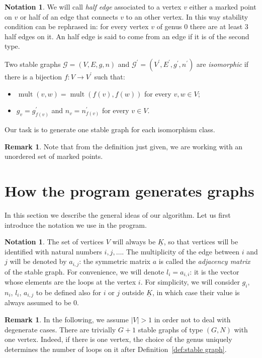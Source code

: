 \documentclass{amsart}
\theoremstyle{plain}
\theoremstyle{definition}
\newtheorem{remark}[theorem]{Remark}
\newtheorem{notation}[theorem]{Notation}
\DeclareMathOperator{\mult}{mult}
\newcommand{\graph}{\mathcal{G}}
\newcommand{\abs}[1]{\left|#1\right|}
\newcommand{\ubar}[1]{\underline{#1}}
\begin{document}
\begin{notation} We will call \emph{half edge} associated to a vertex $v$
either a marked point on $v$ or half of an edge that connects $v$ to an
other vertex. In this way stability condition can be rephrased in: for
every vertex $v$ of genus $0$ there are at least $3$ half edges on it.
An half edge is said to come from an edge if it is of the second type.
\end{notation}

Two stable graphs $\graph = (V, E, g, n)$ and $\graph^\prime =
(V^\prime, E^\prime, g^\prime, n^\prime)$ are \emph{isomorphic\/} if
there is a bijection $f\colon V \to V^\prime$ such that:
\begin{itemize}
\item $\mult(v, w) = \mult(f(v), f(w))$ for every $v, w \in V$;
\item $g_v = g^\prime_{f(v)}$ and $n_v = n^\prime_{f(v)}$ for every $v
  \in V$.
\end{itemize}
Our task is to generate one stable graph for each isomorphism class.

\begin{remark}
  Note that from the definition just given, we are working with an
  unordered set of marked points.
\end{remark}



\section{How the program generates graphs}

In this section we describe the general ideas of our algorithm. Let us
first introduce the notation we use in the program.

\begin{notation}\label{not:gnla}
  The set of vertices $V$ will always be $\ubar{K}$, so that vertices
  will be identified with natural numbers $i, j, \dots$. The
  multiplicity of the edge between $i$ and $j$ will be denoted by
  $a_{i,j}$: the symmetric matrix $a$ is called the \emph{adjacency
    matrix} of the stable graph. For convenience, we will denote $l_i
  = a_{i,i}$: it is the vector whose elements are the loops at the
  vertex $i$. For simplicity, we will consider $g_i$, $n_i$, $l_i$,
  $a_{i,j}$ to be defined also for $i$ or $j$ outside $\ubar{K}$, in
  which case their value is always assumed to be $0$.
\end{notation}

\begin{remark}
  In the following, we assume $\abs{V} > 1$ in order not to deal with
  degenerate cases. There are trivially $G+1$ stable graphs of type
  $(G, N)$ with one vertex. Indeed, if there is one vertex, the choice
  of the genus uniquely determines the number of loops on it after
  Definition~\ref{def:stable graph}.
\end{remark}
\end{document}
